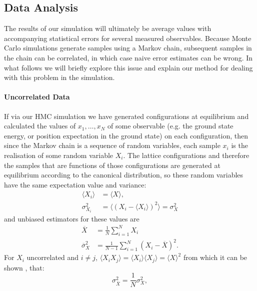 \documentclass[12pt]{article}
\begin{document}
            \subsection{Data Analysis}
            The results of our simulation will ultimately be average values with accompanying statistical errors for several measured observables. Because Monte Carlo simulations generate samples using a Markov chain, subsequent samples in the chain can be correlated, in which case naive error estimates can be wrong. In what follows we will briefly explore this issue and explain our method for dealing with this problem in the simulation.

            \paragraph{Uncorrelated Data}
            If via our HMC simulation we have generated configurations at equilibrium and calculated the values of $x_1,\dots,x_N$ of some observable (e.g. the ground state energy, or position expectation in the ground state) on each configuration, then since the Markov chain is a sequence of random variables, each sample $x_i$ is the realisation of some random variable $X_i$. The lattice configurations and therefore the samples that are functions of those configurations are generated at equilibrium according to the canonical distribution, so these random variables have the same expectation value and variance:
            \begin{align}
                \langle X_i \rangle & = \langle X \rangle, \\
                \sigma^2_{X_i} & = \langle \left(X_i-\langle X_i\rangle\right)^2 \rangle = \sigma_X^2
            \end{align}
            and unbiased estimators for these values are \cite{gattringer_lang_2013}
            \begin{align}
                \overline{X} & = \frac{1}{N}\sum_{i=1}^{N} X_i \\
                \overline{\sigma}_X^2 & = \frac{1}{N-1}\sum_{i=1}^N\left(X_i-\overline{X}\right)^2.
            \end{align}
            For $X_i$ uncorrelated and $i\neq j$, $\langle X_iX_j \rangle = \langle X_i \rangle \langle X_j \rangle = \langle X \rangle^2$ from which it can be shown \cite{gattringer_lang_2013}, that:
            \begin{equation}
                \label{eq:sdRelation1}
                \sigma^2_{\overline{X}} = \frac{1}{N}\sigma^2_X,
            \end{equation}
\end{document}
